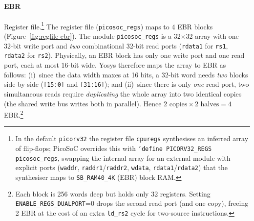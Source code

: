 \documentclass[9pt, a4paper]{extarticle}
\begin{document}
\paragraph{EBR} Register file.\footnote{In the default \texttt{picorv32} the register file \texttt{cpuregs} synthesises an inferred array of flip-flops; PicoSoC overrides this with \texttt{`define PICORV32\_REGS picosoc\_regs}, swapping the internal array for an external module with explicit ports (\texttt{waddr}, \texttt{raddr1}/\texttt{raddr2}, \texttt{wdata}, \texttt{rdata1}/\texttt{rdata2}) that the synthesiser maps to \texttt{SB\_RAM40\_4K} (EBR) block RAM.} The register file (\texttt{picosoc\_regs}) maps to 4 EBR blocks (Figure~\ref{fig:regfile-ebr}). The module \texttt{picosoc\_regs} is a 32$\times$32 array with one 32-bit write port and \emph{two} combinational 32-bit read ports (\texttt{rdata1} for \texttt{rs1}, \texttt{rdata2} for \texttt{rs2}). Physically, an EBR block has only one write port and one read port, each at most 16-bit wide. Yosys therefore maps the array to EBR as follows: (i)~since the data width maxes at 16 bits, a 32-bit word needs \emph{two} blocks side-by-side (\texttt{[15:0]} and \texttt{[31:16]}); and (ii)~since there is only \emph{one} read port, two simultaneous reads require \emph{duplicating} the whole array into two identical copies (the shared write bus writes both in parallel). Hence $2\text{ copies}\times2\text{ halves}=4$ EBR.\footnote{Each block is 256 words deep but holds only 32 registers. Setting \texttt{ENABLE\_REGS\_DUALPORT}=0 drops the second read port (and one copy), freeing 2 EBR at the cost of an extra \texttt{ld\_rs2} cycle for two-source instructions.}
\end{document}
